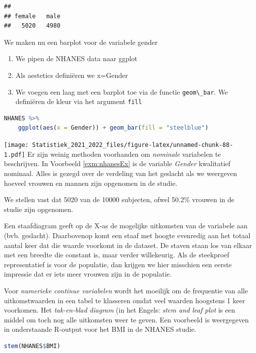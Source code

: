 \documentclass[
  12pt,dutch,coursenotes]{book}
\newcommand{\passthrough}[1]{#1}
\providecommand{\tightlist}{%
  \setlength{\itemsep}{0pt}\setlength{\parskip}{0pt}}
\theoremstyle{definition}
\theoremstyle{definition}
\theoremstyle{definition}
\theoremstyle{definition}
\theoremstyle{remark}
\begin{document}
\begin{lstlisting}
## 
## female   male 
##   5020   4980
\end{lstlisting}

We maken nu een barplot voor de variabele gender

\begin{enumerate}
\def\labelenumi{\arabic{enumi}.}
\tightlist
\item
  We pipen de NHANES data naar ggplot
\item
  Als aestetics definiëren we x=Gender
\item
  We voegen een laag met een barplot toe via de functie \passthrough{\lstinline!geom\_bar!}. We definiëren de kleur via het argument \passthrough{\lstinline!fill!}
\end{enumerate}

\begin{lstlisting}[language=R]
NHANES %>%
    ggplot(aes(x = Gender)) + geom_bar(fill = "steelblue")
\end{lstlisting}

\texttt{[image: Statistiek\_2021\_2022\_files/figure-latex/unnamed-chunk-88-1.pdf]}
Er zijn weinig methoden voorhanden om \emph{nominale} variabelen te
beschrijven. In Voorbeeld \ref{exm:nhanesEx} is de variable \emph{Gender}
kwalitatief nominaal.
Alles is gezegd over de verdeling van het geslacht als we weergeven hoeveel vrouwen en mannen zijn opgenomen in de studie.

We stellen vast dat 5020 van de 10000 subjecten, ofwel 50.2\% vrouwen in de studie zijn opgenomen.

Een staafdiagram geeft op de X-as de mogelijke uitkomsten van de variabele
aan (bvb. geslacht). Daarbovenop komt een staaf met hoogte evenredig aan
het totaal aantal keer dat die waarde voorkomt in de dataset. De staven staan los van elkaar met een breedte die constant is, maar verder willekeurig. Als de steekproef
representatief is voor de populatie, dan
krijgen we hier misschien een eerste impressie dat er iets meer vrouwen zijn in de populatie.

Voor \emph{numerieke continue variabelen} wordt het moeilijk om de
frequentie van alle uitkomstwaarden in een tabel te klasseren omdat veel
waarden hoogstens 1 keer voorkomen. Het \emph{tak-en-blad diagram} (in het
Engels: \emph{stem and leaf plot} is een middel om toch nog alle
uitkomsten weer te geven. Een voorbeeld is weergegeven in onderstaande R-output voor het BMI in de NHANES studie.

\begin{lstlisting}[language=R]
stem(NHANES$BMI)
\end{lstlisting}
\end{document}

